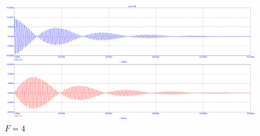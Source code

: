 \documentclass[a4paper, 14pt]{article}%
\begin{document}
\begin{enumerate}
\begin{figure}[h!]
\centering
\includegraphics[scale = 0.4]{images/plot2-3_3.png}
\caption{$F = 4$}
\label{fig:Image1}
\end{figure}

\end{enumerate}
\end{document}
